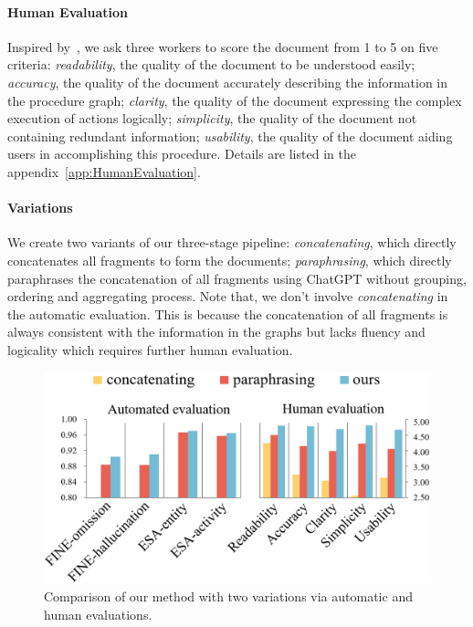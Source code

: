 \paragraph{Human Evaluation}
 Inspired by~\citet{miller1979humanistic}, we ask three workers to score the document from 1 to 5 on five criteria:
\textit{readability}, the quality of the document to be understood easily;
\textit{accuracy}, the quality of the document accurately describing the information in the procedure graph;
\textit{clarity}, the quality of the document expressing the complex execution of actions logically;
\textit{simplicity}, the quality of the document not containing redundant information;
\textit{usability}, the quality of the document aiding users in accomplishing this procedure.
Details are listed in the appendix~\ref{app:HumanEvaluation}.

\paragraph{Variations}
 We create two variants of our three-stage pipeline: \textit{concatenating}, which directly concatenates all fragments to form the documents; \textit{paraphrasing}, which directly paraphrases the concatenation of all fragments using ChatGPT without grouping, ordering and aggregating process.
Note that, we don't involve \textit{concatenating} in the automatic evaluation. This is because the concatenation of all fragments is always consistent with the information in the graphs but lacks fluency and logicality which requires further human evaluation.
\begin{figure}[t]
    \centering
    \includegraphics[width=1\linewidth]{figures/dataset/DatasetEva_Human.png}

    \caption{Comparison of our method with two variations via automatic and human evaluations.}
    \label{fig:DatasetEva&Human}

\end{figure}

